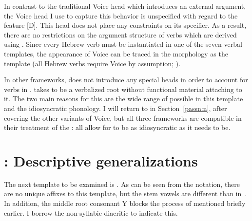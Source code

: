 \begin{exe}
\begin{xlist}
\begin{exe}
\begin{xlist}
\begin{exe}
\begin{xlist}
\begin{exe}
\begin{exe}
\begin{xlist}
\begin{exe}
\begin{xlist}
\begin{exe}
\begin{xlist}
\begin{exe}
\begin{xlist}
\begin{exe}
\begin{xlist}
\begin{exe}
\begin{xlist}
\begin{exe}
\begin{xlist}
\begin{exe}
\begin{xlist}
\begin{exe}
\begin{xlist}
\begin{exe}
\begin{xlist}
\begin{exe}
\begin{xlist}
\begin{exe}
\begin{xlist}
\begin{exe}
\begin{xlist}
\begin{exe}
\begin{exe}
\begin{xlist}
\begin{exe}
\begin{xlist}
\begin{exe}
\begin{xlist}
\begin{exe}
\begin{xlist}
\begin{exe}
\begin{xlist}
\begin{exe}
\begin{xlist}
\begin{exe}
\begin{xlist}
\begin{exe}
\begin{xlist}
\begin{xlist}
\begin{xlist}
\begin{exe}
\begin{xlist}
\begin{xlist}
\begin{xlist}
\begin{exe}
\begin{exe}
\begin{xlist}
In contrast to the traditional Voice head which introduces an external argument, the Voice head I use to capture this behavior is unspecified with regard to the  feature [D]. This head does not place any constraints on its specifier. As a result, there are no restrictions on the argument structure of verbs which are derived using . Since every Hebrew verb must be instantiated in one of the seven verbal templates, the appearance of Voice can be traced in the morphology as the template {\tkal} (all Hebrew verbs require Voice by assumption; \citealt{arad05}).

In other frameworks, \cite{doron03} does not introduce any special heads in order to account for verbs in {\tkal}. \cite{borer13oup,borer15roots} takes {\tkal} to be a verbalized root without functional material attaching to it. The two main reasons for this are the wide range of  possible in this template and the idiosyncratic phonology. I will return to  in Section~\ref{passn:n}, after covering the other variants of Voice, but all three frameworks are compatible in their treatment of the {\tkal}: all allow for {\tkal} to be as idiosyncratic as it needs to be.

\section{\tpie: Descriptive generalizations} \label{voice:tpie}
The next template to be examined is {\tpie}. As can be seen from the notation, there are no unique affixes to this template, but the stem vowels are different than in~{\tkal}. In addition, the middle root consonant Y blocks the process of  mentioned briefly earlier. I borrow the non-syllabic diacritic  to indicate this.


\end{xlist}
\end{exe}
\end{exe}
\end{xlist}
\end{xlist}
\end{xlist}
\end{exe}
\end{xlist}
\end{xlist}
\end{xlist}
\end{exe}
\end{xlist}
\end{exe}
\end{xlist}
\end{exe}
\end{xlist}
\end{exe}
\end{xlist}
\end{exe}
\end{xlist}
\end{exe}
\end{xlist}
\end{exe}
\end{xlist}
\end{exe}
\end{exe}
\end{xlist}
\end{exe}
\end{xlist}
\end{exe}
\end{xlist}
\end{exe}
\end{xlist}
\end{exe}
\end{xlist}
\end{exe}
\end{xlist}
\end{exe}
\end{xlist}
\end{exe}
\end{xlist}
\end{exe}
\end{xlist}
\end{exe}
\end{xlist}
\end{exe}
\end{xlist}
\end{exe}
\end{xlist}
\end{exe}
\end{xlist}
\end{exe}
\end{exe}
\end{xlist}
\end{exe}
\end{xlist}
\end{exe}
\end{xlist}
\end{exe}
